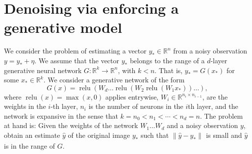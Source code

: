 \documentclass[11pt]{article}
\newcommand{\R}{\mathbb{R}}
\newcommand{\xo}{x_\ast}
\newcommand{\Win}[1]{W_{#1}}
\DeclareMathOperator{\relu}{relu}
\newcommand{\noise}{\eta}
\newcommand{\Tnorm}{}
\newcommand\norm[2][\Tnorm]{\ensuremath{{\left\|#2\right\|}_{#1}}}
\begin{document}
\begin{abstract}
Deep neural networks provide state-of-the-art performance for image denoising, where the goal is to recover a near noise-free image from a noisy observation.
The underlying principle is that neural networks trained on large datasets have empirically been shown to be able to generate natural images well from a low-dimensional latent representation of the image.
Given such a generator network, a noisy image can be denoised by i) finding the closest image in the range of the generator or by ii) passing it through an encoder-generator architecture (known as an autoencoder).
However, there is little theory to justify this success, let alone to predict the denoising performance as a function of the network parameters.
In this paper we consider the problem of denoising an image from additive Gaussian noise using the two generator based approaches. 
In both cases, we assume the image is well described by a deep neural network with ReLU activations functions, mapping a $k$-dimensional code to an $n$-dimensional image. In the case of the autoencoder, we show that the feedforward network reduces noise energy by a factor of $O(k/n)$. 
In the case of optimizing over the range of a generative model, we state and analyze a simple gradient algorithm that minimizes a non-convex loss function, and provably reduces noise energy by a factor of $O(k/n)$.
We also demonstrate in numerical experiments that this denoising performance is, indeed, achieved by generative priors learned from data.
\end{abstract}
%





\section{\label{sec:erm}Denoising via enforcing a generative model}

We consider the problem of estimating a vector $y_\ast \in \R^{n}$
from a noisy observation $y = y_\ast + \noise$.
We assume that the vector $y_\ast$ belongs to the range of a $d$-layer generative neural network $G\colon \R^k \to \R^{n}$, with $k<n$.  That is, $y_\ast = G(x_\ast)$ for some $x_\ast \in \R^k$.
We consider a generative network of the form
\[
G(x) = \relu(\Win{d} \ldots \relu (\Win{2} \relu(\Win{1} \xo)) \ldots ),
\]
where $\relu(x) = \max(x, 0)$ applies entrywise,
$W_i \in \R^{n_i \times n_{i-1}}$, are the weights in the $i$-th layer,
$n_i$ is the number of neurons in the $i$th layer,
and the network is expansive in the sense that $k=n_0 < n_1 < \cdots < n_d = n$.
The problem at hand is:
Given the weights of the network $W_1\ldots W_d$ and a noisy observation $y$, obtain an estimate $\hat y$ of the original image $y_\ast$ such that $\norm{\hat y - y_\ast}$ is small and $\hat y$ is in the range of $G$.
\end{document}
